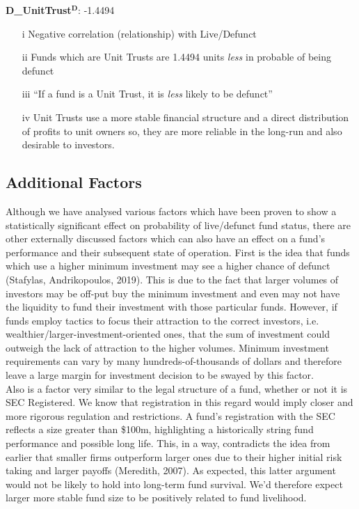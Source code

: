\documentclass[11pt, english]{article}
\begin{document}
	\textbf{D\_UnitTrust$\mathbf{^D}$}: -1.4494

        \begin{itemize}
        \setlength\itemsep{0cm}
                \item[i] Negative correlation (relationship) with Live/Defunct
		\item[ii] Funds which are Unit Trusts are 1.4494 units \textit{less} in probable of being defunct
		\item[iii] ``If a fund is a Unit Trust, it is \textit{less} likely to be defunct''
                \item[iv] Unit Trusts use a more stable financial structure and a direct distribution of profits to unit owners so, they are more reliable in the long-run and also desirable to investors.
        \end{itemize}

	\subsection{Additional Factors}

	Although we have analysed various factors which have been proven to show a statistically significant effect on probability of live/defunct fund status, there are other externally discussed factors which can also have an effect on a fund’s performance and their subsequent state of operation. First is the idea that funds which use a higher minimum investment may see a higher chance of defunct (Stafylas, Andrikopoulos, 2019). This is due to the fact that larger volumes of investors may be off-put buy the minimum investment and even may not have the liquidity to fund their investment with those particular funds. However, if funds employ tactics to focus their attraction to the correct investors, i.e. wealthier/larger-investment-oriented ones, that the sum of investment could outweigh the lack of attraction to the higher volumes. Minimum investment requirements can vary by many hundreds-of-thousands of dollars and therefore leave a large margin for investment decision to be swayed by this factor.\\

	Also is a factor very similar to the legal structure of a fund, whether or not it is SEC Registered. We know that registration in this regard would imply closer and more rigorous regulation and restrictions. A fund’s registration with the SEC reflects a size greater than \$100m, highlighting a historically string fund performance and possible long life. This, in a way, contradicts the idea from earlier that smaller firms outperform larger ones due to their higher initial risk taking and larger payoffs (Meredith, 2007). As expected, this latter argument would not be likely to hold into long-term fund survival. We’d therefore expect larger more stable fund size to be positively related to fund livelihood.\\
\end{document}
